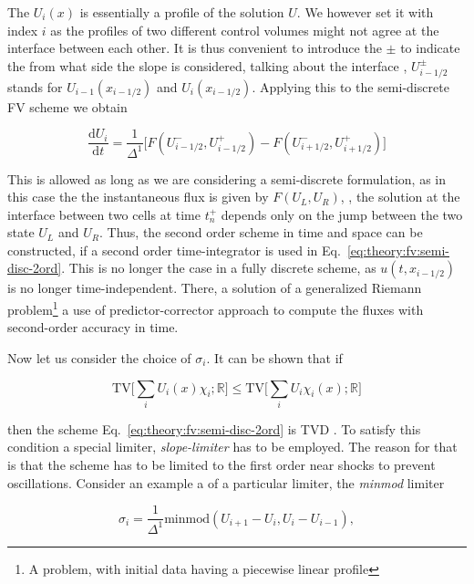 The $U_i(x)$ is essentially a profile of the solution $U$. We however set it with index $i$ as the profiles of two different control volumes might not agree at the interface between each other. It is thus convenient to introduce the $\pm$ to indicate the from what side the slope is considered, talking about the interface \ie, $U^{\pm} _{i-1/2}$ stands for $U_{i-1}(x_{i-1/2})$ and $U_i(x_{i-1/2})$. Applying this to the semi-discrete \ac{FV} scheme we obtain 

\begin{equation}
\frac{\text{d} U_i}{\text{d}t} = \frac{1}{\Delta^1}\big[F(U^{-}_{i-1/2},U^{+}_{i-1/2}) - F(U^{-}_{i+1/2},U^{+}_{i+1/2})\big]
\label{eq:theory:fv:semi-disc-2ord}
\end{equation}

This is allowed as long as we are considering a semi-discrete formulation, as in this case the the instantaneous flux is given by $F(U_L, U_R)$, \ie, the solution at the interface between two cells at time $t_n ^+$ depends only on the jump between the two state $U_L$ and $U_R$. Thus, the second order scheme in time and space can be constructed, if a second order time-integrator is used in Eq.~\eqref{eq:theory:fv:semi-disc-2ord}. This is no longer the case in a fully discrete scheme, as $u(t, x_{i-1/2})$ is no longer time-independent. There, a solution of a generalized Riemann problem\footnote{
    A problem, with initial data having a piecewise linear profile
} a use of predictor-corrector approach to compute the fluxes with second-order accuracy in time. 

Now let us consider the choice of $\sigma_i$. 
It can be shown that if 

\begin{equation}
\text{TV}\Bigg[\sum_{i}U_{i}(x)\chi_{i};\mathbb{R}\Bigg] \leq \text{TV}\Bigg[\sum_{i}U_{i}\chi_{i}(x);\mathbb{R}\Bigg]
\end{equation}

then the scheme Eq.~\eqref{eq:theory:fv:semi-disc-2ord} is \ac{TVD} . To satisfy this condition a special limiter, \textit{slope-limiter} has to be employed. The reason for that is that the scheme has to be limited to the first order near shocks to prevent oscillations. Consider an example a of a particular limiter, the \textit{minmod} limiter

\begin{equation}
\sigma_i = \frac{1}{\Delta^1}\text{minmod}(U_{i+1} - U_{i}, U_{i}-U_{i-1}),
\end{equation}

